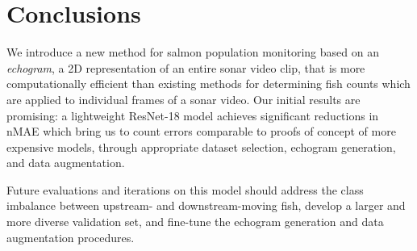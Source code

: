 \section{Conclusions}

We introduce a new method for salmon population monitoring based on an \textit{echogram}, a 2D representation of an entire sonar video clip, that is more computationally efficient than existing methods for determining fish counts which are applied to individual frames of a sonar video. Our initial results are promising: a lightweight ResNet-18 model achieves significant reductions in nMAE which bring us to count errors comparable to proofs of concept of more expensive models, through appropriate dataset selection, echogram generation, and data augmentation.

Future evaluations and iterations on this model should address the class imbalance between upstream- and downstream-moving fish, develop a larger and more diverse validation set, and fine-tune the echogram generation and data augmentation procedures. %
